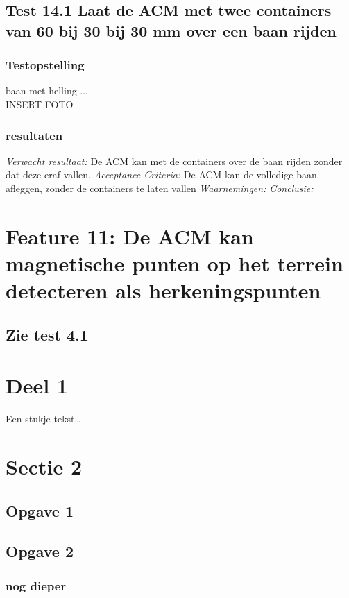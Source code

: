 \documentclass{article}
\begin{document}
\subsection{Test 14.1 Laat de ACM met twee containers van 60 bij 30 bij 30 mm over een baan rijden}
\subsubsection{Testopstelling}
baan met helling ... \\
INSERT FOTO
\subsubsection{resultaten}
\textit{Verwacht resultaat: }De ACM kan met de containers over de baan rijden zonder dat deze eraf vallen.
\newline
\textit{Acceptance Criteria: }De ACM kan de volledige baan afleggen, zonder de containers te laten vallen
\newline
\textit{Waarnemingen: }
\newline
\textit{Conclusie: }

\section{Feature 11: De ACM kan magnetische punten op het terrein detecteren als herkeningspunten}
\subsection{Zie test 4.1}



\newpage
\section{Deel 1}
Een stukje tekst\ldots 
\section{Sectie 2}
\subsection{Opgave 1}
\subsection{Opgave 2}
\subsubsection{nog dieper}
\end{document}
